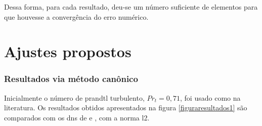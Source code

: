 Dessa forma, para cada resultado, deu-se um número suficiente de elementos para que houvesse a convergência do erro numérico.


\chapter{Ajustes propostos}

\subsection{Resultados via método canônico}
Inicialmente o número de prandtl turbulento, $Pr_t = 0,71$, foi usado como na literatura. Os resultados obtidos apresentados na figura \ref{figuraresultados1} são comparados com os dns de \cite{dns1020} e \cite{dns150}, com a norma l2.\\

